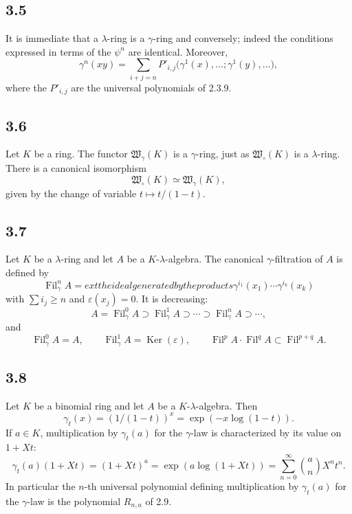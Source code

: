 \documentclass[13pt]{extarticle}
\newcommand{\Fil}{\operatorname{Fil}}
\newcommand{\Ker}{\operatorname{Ker}}
\begin{document}
\subsection*{3.5}
It is immediate that a $\lambda$-ring is a $\gamma$-ring and conversely; indeed the conditions expressed in terms of the $\psi^n$ are identical. Moreover,
\begin{equation}\label{eq:3.5.1}
\gamma^n(xy)=\sum_{i+j=n}P'_{i,j}\bigl(\gamma^1(x),\ldots;\gamma^1(y),\ldots\bigr),
\end{equation}
where the $P'_{i,j}$ are the universal polynomials of 2.3.9.

\subsection*{3.6}
Let $K$ be a ring. The functor $\mathfrak W_\gamma(K)$ is a $\gamma$-ring, just as $\mathfrak W_\circ(K)$ is a $\lambda$-ring. There is a canonical isomorphism
\begin{equation}\label{eq:3.6}
\mathfrak W_\circ(K)\simeq \mathfrak W_\gamma(K),
\end{equation}
given by the change of variable $t\mapsto t/(1-t)$.

\subsection*{3.7}
Let $K$ be a $\lambda$-ring and let $A$ be a $K$-$\lambda$-algebra. The canonical $\gamma$-filtration of $A$ is defined by
\begin{equation}\label{eq:3.7}
\Fil^n_\gamma A=	ext{the ideal generated by the products }\gamma^{i_1}(x_1)\cdots\gamma^{i_k}(x_k)
\end{equation}
with $\sum i_j\geq n$ and $\varepsilon(x_j)=0$. It is decreasing:
\[
A=\Fil^0_\gamma A\supset \Fil^1_\gamma A\supset\cdots\supset \Fil^n_\gamma A\supset\cdots,
\]
and
\begin{equation}\label{eq:3.7.1}
\Fil^0_\gamma A=A,
\qquad
\Fil^1_\gamma A=\Ker(\varepsilon),
\qquad
\Fil^pA\cdot\Fil^qA\subset\Fil^{p+q}A.
\end{equation}

\subsection*{3.8}
Let $K$ be a binomial ring and let $A$ be a $K$-$\lambda$-algebra. Then
\begin{equation}\label{eq:3.8}
\gamma_t(x)=(1/(1-t))^x=\exp(-x\log(1-t)).
\end{equation}
If $a\in K$, multiplication by $\gamma_t(a)$ for the $\gamma$-law is characterized by its value on $1+Xt$:
\begin{equation}\label{eq:3.8.1}
\gamma_t(a)(1+Xt)=(1+Xt)^a=\exp(a\log(1+Xt))=\sum_{n=0}^{\infty}\binom{a}{n}X^nt^n.
\end{equation}
In particular the $n$-th universal polynomial defining multiplication by $\gamma_t(a)$ for the $\gamma$-law is the polynomial $R_{n,a}$ of 2.9.
\end{document}
